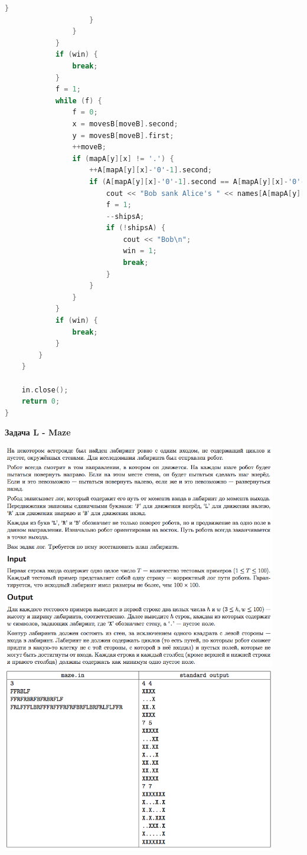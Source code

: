 \documentclass[a4paper,12pt]{article}
\begin{document}
\begin{lstlisting}[language=C++]
                        }
                    }
                }
            }
            if (win) {
                break;
            }
            f = 1;
            while (f) {
                f = 0;
                x = movesB[moveB].second;
                y = movesB[moveB].first;
                ++moveB;
                if (mapA[y][x] != '.') {
                    ++A[mapA[y][x]-'0'-1].second;
                    if (A[mapA[y][x]-'0'-1].second == A[mapA[y][x]-'0'-1].first) {
                        cout << "Bob sank Alice's " << names[A[mapA[y][x]-'0'-1].first-1] << '\n';
                        f = 1;
                        --shipsA;
                        if (!shipsA) {
                            cout << "Bob\n";
                            win = 1;
                            break;
                        }
                    }
                }
            }
            if (win) {
                break;
            }
        }
    }

    in.close();
    return 0;
}
\end{lstlisting}
\newpage
\textbf{{\large Задача L - Maze}} \\
\begin{center}
\includegraphics[width=0.9\textwidth]{OC_Karelia/OC_Karelia_L1.png}\\ [1cm]
\includegraphics[width=0.9\textwidth]{OC_Karelia/OC_Karelia_L2.png}\\ [1cm]
\end{center}
\newpage
\end{document}
